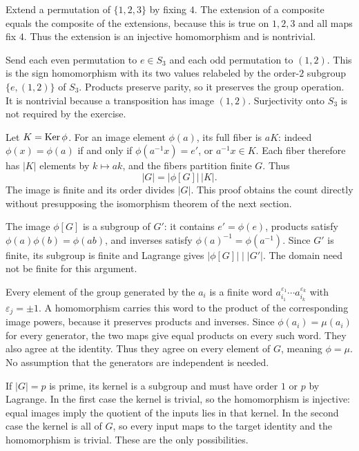 Extend a permutation of $\{1,2,3\}$ by fixing $4$. The extension of a composite equals the composite of the extensions, because this is true on $1,2,3$ and all maps fix $4$. Thus the extension is an injective homomorphism and is nontrivial.

Send each even permutation to $e\in S_3$ and each odd permutation to $(1,2)$. This is the sign homomorphism with its two values relabeled by the order-$2$ subgroup $\{e,(1,2)\}$ of $S_3$. Products preserve parity, so it preserves the group operation. It is nontrivial because a transposition has image $(1,2)$. Surjectivity onto $S_3$ is not required by the exercise.

Let $K=\operatorname{Ker}\phi$. For an image element $\phi(a)$, its full fiber is $aK$: indeed $\phi(x)=\phi(a)$ if and only if $\phi(a^{-1}x)=e'$, or $a^{-1}x\in K$. Each fiber therefore has $|K|$ elements by $k\mapsto ak$, and the fibers partition finite $G$. Thus
\[|G|=|\phi[G]|\,|K|.\]
The image is finite and its order divides $|G|$. This proof obtains the count directly without presupposing the isomorphism theorem of the next section.

The image $\phi[G]$ is a subgroup of $G'$: it contains $e'=\phi(e)$, products satisfy $\phi(a)\phi(b)=\phi(ab)$, and inverses satisfy $\phi(a)^{-1}=\phi(a^{-1})$. Since $G'$ is finite, its subgroup is finite and Lagrange gives $|\phi[G]|\mid|G'|$. The domain need not be finite for this argument.

Every element of the group generated by the $a_i$ is a finite word $a_{i_1}^{\varepsilon_1}\cdots a_{i_k}^{\varepsilon_k}$ with $\varepsilon_j=\pm1$. A homomorphism carries this word to the product of the corresponding image powers, because it preserves products and inverses. Since $\phi(a_i)=\mu(a_i)$ for every generator, the two maps give equal products on every such word. They also agree at the identity. Thus they agree on every element of $G$, meaning $\phi=\mu$. No assumption that the generators are independent is needed.

If $|G|=p$ is prime, its kernel is a subgroup and must have order $1$ or $p$ by Lagrange. In the first case the kernel is trivial, so the homomorphism is injective: equal images imply the quotient of the inputs lies in that kernel. In the second case the kernel is all of $G$, so every input maps to the target identity and the homomorphism is trivial. These are the only possibilities.

